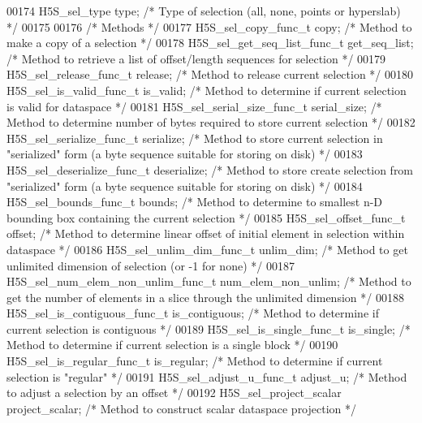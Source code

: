 \begin{DoxyCode}
00174     H5S\_sel\_type type;                          \textcolor{comment}{/* Type of selection (all, none, points or hyperslab) */}
00175 
00176     \textcolor{comment}{/* Methods */}
00177     H5S\_sel\_copy\_func\_t copy;                   \textcolor{comment}{/* Method to make a copy of a selection */}
00178     H5S\_sel\_get\_seq\_list\_func\_t get\_seq\_list;   \textcolor{comment}{/* Method to retrieve a list of offset/length sequences for
       selection */}
00179     H5S\_sel\_release\_func\_t release;             \textcolor{comment}{/* Method to release current selection */}
00180     H5S\_sel\_is\_valid\_func\_t is\_valid;           \textcolor{comment}{/* Method to determine if current selection is valid for
       dataspace */}
00181     H5S\_sel\_serial\_size\_func\_t serial\_size;     \textcolor{comment}{/* Method to determine number of bytes required to store
       current selection */}
00182     H5S\_sel\_serialize\_func\_t serialize;         \textcolor{comment}{/* Method to store current selection in "serialized" form
       (a byte sequence suitable for storing on disk) */}
00183     H5S\_sel\_deserialize\_func\_t deserialize;     \textcolor{comment}{/* Method to store create selection from "serialized" form
       (a byte sequence suitable for storing on disk) */}
00184     H5S\_sel\_bounds\_func\_t bounds;               \textcolor{comment}{/* Method to determine to smallest n-D bounding box
       containing the current selection */}
00185     H5S\_sel\_offset\_func\_t offset;               \textcolor{comment}{/* Method to determine linear offset of initial element in
       selection within dataspace */}
00186     H5S\_sel\_unlim\_dim\_func\_t unlim\_dim;              \textcolor{comment}{/* Method to get unlimited dimension of selection (or
       -1 for none) */}
00187     H5S\_sel\_num\_elem\_non\_unlim\_func\_t num\_elem\_non\_unlim; \textcolor{comment}{/* Method to get the number of elements in a
       slice through the unlimited dimension */}
00188     H5S\_sel\_is\_contiguous\_func\_t is\_contiguous; \textcolor{comment}{/* Method to determine if current selection is contiguous 
      */}
00189     H5S\_sel\_is\_single\_func\_t is\_single;         \textcolor{comment}{/* Method to determine if current selection is a single
       block */}
00190     H5S\_sel\_is\_regular\_func\_t is\_regular;       \textcolor{comment}{/* Method to determine if current selection is "regular" */}
00191     H5S\_sel\_adjust\_u\_func\_t adjust\_u;           \textcolor{comment}{/* Method to adjust a selection by an offset */}
00192     H5S\_sel\_project\_scalar project\_scalar;      \textcolor{comment}{/* Method to construct scalar dataspace projection */}

\end{DoxyCode}
